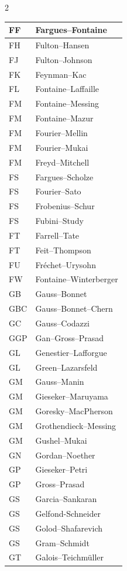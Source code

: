 \documentclass{amsart}
\numberwithin{equation}{section}
\theoremstyle{plain}
\numberwithin{equation}{section}
\theoremstyle{remark}
\begin{document}
\begin{multicols}{2}
{\begin{longtable}{l|l}
FF & Fargues--Fontaine\\ \hline
FH & Fulton--Hansen\\ \hline
FJ & Fulton--Johnson\\ \hline
FK & Feynman--Kac\\ \hline
FL & Fontaine--Laffaille\\ \hline
FM &  Fontaine--Messing\\ \hline
FM & Fontaine--Mazur\\ \hline
FM & Fourier--Mellin\\ \hline
FM & Fourier--Mukai\\ \hline
FM & Freyd--Mitchell\\ \hline
FS & Fargues--Scholze\\ \hline
FS & Fourier--Sato\\ \hline
FS & Frobenius--Schur\\ \hline
FS & Fubini--Study\\ \hline
FT & Farrell--Tate\\ \hline
FT & Feit--Thompson\\ \hline
FU & Fréchet--Urysohn\\ \hline
FW & Fontaine--Winterberger\\ \hline
GB & Gauss--Bonnet\\ \hline
GBC & Gauss--Bonnet--Chern\\ \hline
GC & Gauss--Codazzi\\ \hline
GGP & Gan--Gross--Prasad\\ \hline
GL & Genestier--Lafforgue\\ \hline
GL & Green--Lazarsfeld\\ \hline
GM & Gauss--Manin\\ \hline
GM & Gieseker--Maruyama\\ \hline
GM & Goresky--MacPherson\\ \hline
GM & Grothendieck--Messing\\ \hline
GM & Gushel--Mukai\\ \hline
GN & Gordan--Noether\\ \hline
GP & Gieseker--Petri\\ \hline
GP & Gross--Prasad\\ \hline
GS & Garcia--Sankaran\\ \hline
GS & Gelfond-Schneider\\ \hline
GS & Golod--Shafarevich\\ \hline
GS & Gram--Schmidt\\ \hline
GT & Galois--Teichmüller\\ \hline

\end{longtable}}
\end{multicols}
\end{document}
